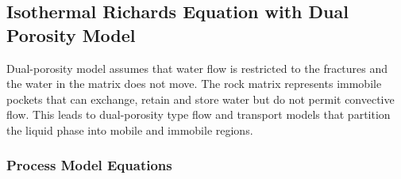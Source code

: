 




\subsection{Isothermal Richards Equation with Dual Porosity Model}
\label{sec:dual-porosity-richards-equation}

Dual-porosity model assumes that water flow is restricted to the fractures and the
water in the matrix does not move.
The rock matrix represents immobile pockets that can exchange, retain and store water
but do not permit convective flow.
This leads to dual-porosity type flow and transport models that partition the liquid
phase into mobile and immobile regions.


\subsubsection{Process Model Equations} 


